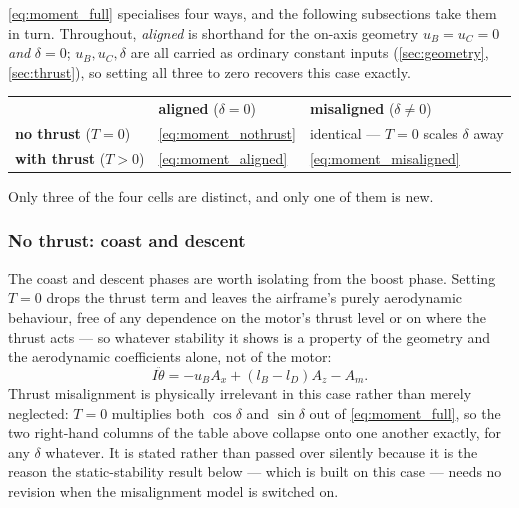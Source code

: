 \autoref{eq:moment_full} specialises four ways, and the following subsections take them in turn.
Throughout, \emph{aligned} is shorthand for the on-axis geometry $u_B=u_C=0$ \emph{and}
$\delta=0$; $u_B,u_C,\delta$ are all carried as ordinary constant inputs (\autoref{sec:geometry},
\autoref{sec:thrust}), so setting all three to zero recovers this case exactly.
\begin{center}
\begin{tabular}{l l l}
 & \textbf{aligned} ($\delta=0$) & \textbf{misaligned} ($\delta\neq0$) \\
\textbf{no thrust} ($T=0$) & \autoref{eq:moment_nothrust} & identical --- $T=0$ scales $\delta$ away \\
\textbf{with thrust} ($T>0$) & \autoref{eq:moment_aligned} & \autoref{eq:moment_misaligned} \\
\end{tabular}
\end{center}
Only three of the four cells are distinct, and only one of them is new.

\subsubsection{No thrust: coast and descent}\label{sec:analysis_nothrust}
The coast and descent phases are worth isolating from the boost phase. Setting $T=0$ drops the
thrust term and leaves the airframe's purely aerodynamic behaviour, free of any dependence on the
motor's thrust level or on where the thrust acts --- so whatever stability it shows is a property
of the geometry and the aerodynamic coefficients alone, not of the motor:
\begin{equation} \label{eq:moment_nothrust}
    I\ddot{\theta} = -u_BA_x + (l_B - l_D)A_z - A_m.
\end{equation}
Thrust misalignment is physically irrelevant in this case rather than merely neglected: $T=0$
multiplies both $\cos\delta$ and $\sin\delta$ out of \autoref{eq:moment_full}, so the two
right-hand columns of the table above collapse onto one another exactly, for any $\delta$
whatever. It is stated rather than passed over silently because it is the reason the
static-stability result below --- which is built on this case --- needs no revision when the
misalignment model is switched on.

